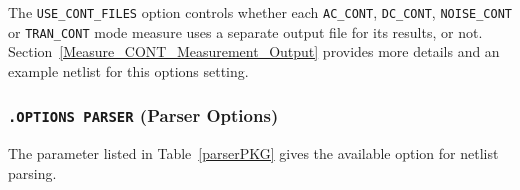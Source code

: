 The \texttt{USE\_CONT\_FILES} option controls whether each \texttt{AC\_CONT},
\texttt{DC\_CONT}, \texttt{NOISE\_CONT} or \texttt{TRAN\_CONT} mode measure uses
a separate output file for its results, or not. Section~\ref{Measure_CONT_Measurement_Output}
provides more details and an example netlist for this options setting.



\subsubsection{\texttt{.OPTIONS PARSER} (Parser Options)}
The parameter listed in Table~\ref{parserPKG} gives the available
option for netlist parsing.




